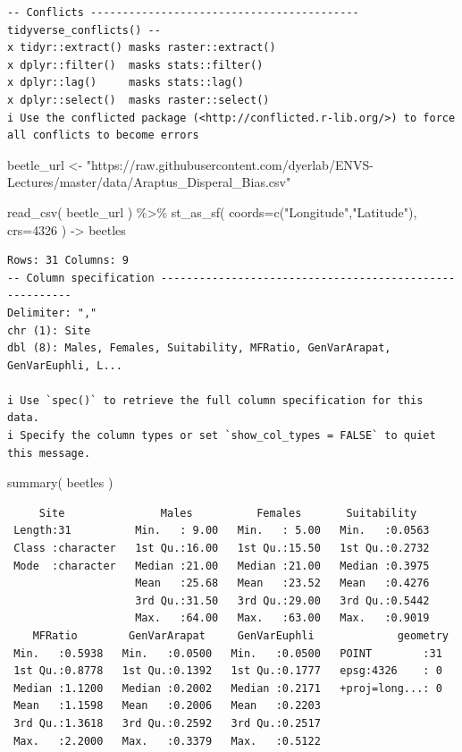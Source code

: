 \documentclass[
  letterpaper,
]{book}
\newenvironment{Shaded}{\begin{snugshade}}{\end{snugshade}}
\newcommand{\AttributeTok}[1]{\textcolor[rgb]{0.40,0.45,0.13}{#1}}
\newcommand{\DecValTok}[1]{\textcolor[rgb]{0.68,0.00,0.00}{#1}}
\newcommand{\FunctionTok}[1]{\textcolor[rgb]{0.28,0.35,0.67}{#1}}
\newcommand{\NormalTok}[1]{\textcolor[rgb]{0.00,0.23,0.31}{#1}}
\newcommand{\OtherTok}[1]{\textcolor[rgb]{0.00,0.23,0.31}{#1}}
\newcommand{\SpecialCharTok}[1]{\textcolor[rgb]{0.37,0.37,0.37}{#1}}
\newcommand{\StringTok}[1]{\textcolor[rgb]{0.13,0.47,0.30}{#1}}
\begin{document}
\begin{verbatim}
-- Conflicts ------------------------------------------ tidyverse_conflicts() --
x tidyr::extract() masks raster::extract()
x dplyr::filter()  masks stats::filter()
x dplyr::lag()     masks stats::lag()
x dplyr::select()  masks raster::select()
i Use the conflicted package (<http://conflicted.r-lib.org/>) to force all conflicts to become errors
\end{verbatim}

\begin{Shaded}
\begin{Highlighting}[]
\NormalTok{beetle\_url }\OtherTok{\textless{}{-}} \StringTok{"https://raw.githubusercontent.com/dyerlab/ENVS{-}Lectures/master/data/Araptus\_Disperal\_Bias.csv"}

\FunctionTok{read\_csv}\NormalTok{( beetle\_url ) }\SpecialCharTok{\%\textgreater{}\%}
  \FunctionTok{st\_as\_sf}\NormalTok{( }\AttributeTok{coords=}\FunctionTok{c}\NormalTok{(}\StringTok{"Longitude"}\NormalTok{,}\StringTok{"Latitude"}\NormalTok{), }\AttributeTok{crs=}\DecValTok{4326}\NormalTok{ ) }\OtherTok{{-}\textgreater{}}\NormalTok{ beetles}
\end{Highlighting}
\end{Shaded}

\begin{verbatim}
Rows: 31 Columns: 9
-- Column specification --------------------------------------------------------
Delimiter: ","
chr (1): Site
dbl (8): Males, Females, Suitability, MFRatio, GenVarArapat, GenVarEuphli, L...

i Use `spec()` to retrieve the full column specification for this data.
i Specify the column types or set `show_col_types = FALSE` to quiet this message.
\end{verbatim}

\begin{Shaded}
\begin{Highlighting}[]
\FunctionTok{summary}\NormalTok{( beetles )}
\end{Highlighting}
\end{Shaded}

\begin{verbatim}
     Site               Males          Females       Suitability    
 Length:31          Min.   : 9.00   Min.   : 5.00   Min.   :0.0563  
 Class :character   1st Qu.:16.00   1st Qu.:15.50   1st Qu.:0.2732  
 Mode  :character   Median :21.00   Median :21.00   Median :0.3975  
                    Mean   :25.68   Mean   :23.52   Mean   :0.4276  
                    3rd Qu.:31.50   3rd Qu.:29.00   3rd Qu.:0.5442  
                    Max.   :64.00   Max.   :63.00   Max.   :0.9019  
    MFRatio        GenVarArapat     GenVarEuphli             geometry 
 Min.   :0.5938   Min.   :0.0500   Min.   :0.0500   POINT        :31  
 1st Qu.:0.8778   1st Qu.:0.1392   1st Qu.:0.1777   epsg:4326    : 0  
 Median :1.1200   Median :0.2002   Median :0.2171   +proj=long...: 0  
 Mean   :1.1598   Mean   :0.2006   Mean   :0.2203                     
 3rd Qu.:1.3618   3rd Qu.:0.2592   3rd Qu.:0.2517                     
 Max.   :2.2000   Max.   :0.3379   Max.   :0.5122                     
\end{verbatim}
\end{document}
